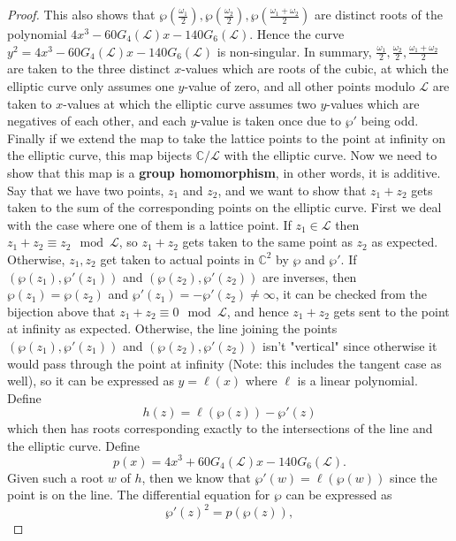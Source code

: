 \documentclass{article}
\theoremstyle{definition}
\theoremstyle{definition}
\theoremstyle{definition}
\begin{document}
\begin{proof}
This also shows that $\wp(\frac{\omega_1}2),\wp(\frac{\omega_2}2),\wp(\frac{\omega_1+\omega_2}2)$ are distinct roots of the polynomial $4x^3-60G_4(\mathcal L)x-140G_6(\mathcal L)$. Hence the curve $y^2=4x^3-60G_4(\mathcal L)x-140G_6(\mathcal L)$ is non-singular. 
\newline\newline
In summary, $\frac{\omega_1}2,\frac{\omega_2}2,\frac{\omega_1+\omega_2}2$ are taken to the three distinct $x$-values which are roots of the cubic, at which the elliptic curve only assumes one $y$-value of zero, and all other points modulo $\mathcal{L}$ are taken to $x$-values at which the elliptic curve assumes two $y$-values which are negatives of each other, and each $y$-value is taken once due to $\wp'$ being odd. Finally if we extend the map to take the lattice points to the point at infinity on the elliptic curve, this map bijects $\mathbb C/\mathcal L$ with the elliptic curve.
\newline\newline
Now we need to show that this map is a \textbf{group homomorphism}, in other words, it is additive. Say that we have two points, $z_1$ and $z_2$, and we want to show that $z_1+z_2$ gets taken to the sum of the corresponding points on the elliptic curve. First we deal with the case where one of them is a lattice point. If $z_1\in\mathcal L$ then $z_1+z_2\equiv z_2\mod\mathcal L$, so $z_1+z_2$ gets taken to the same point as $z_2$ as expected. Otherwise, $z_1,z_2$ get taken to actual points in $\mathbb C^2$ by $\wp$ and $\wp'$. If $(\wp(z_1),\wp'(z_1))$ and $(\wp(z_2),\wp'(z_2))$ are inverses, then $\wp(z_1)=\wp(z_2)$ and $\wp'(z_1)=-\wp'(z_2)\neq\infty$, it can be checked from the bijection above that $z_1+z_2\equiv0\mod\mathcal L$, and hence $z_1+z_2$ gets sent to the point at infinity as expected. Otherwise, the line joining the points $(\wp(z_1),\wp'(z_1))$ and $(\wp(z_2),\wp'(z_2))$ isn't "vertical" since otherwise it would pass through the point at infinity (Note: this includes the tangent case as well), so it can be expressed as $y=\ell(x)$ where $\ell$ is a linear polynomial. Define
$$h(z)=\ell(\wp(z))-\wp'(z)$$
which then has roots corresponding exactly to the intersections of the line and the elliptic curve. Define 
$$p(x)=4x^3+60G_4(\mathcal L)x-140G_6(\mathcal L).$$ Given such a root $w$ of $h$, then we know that $\wp'(w)=\ell(\wp(w))$ since the point is on the line. The differential equation for $\wp$ can be expressed as $$\wp'(z)^2=p(\wp(z)),$$

\end{proof}
\end{document}
